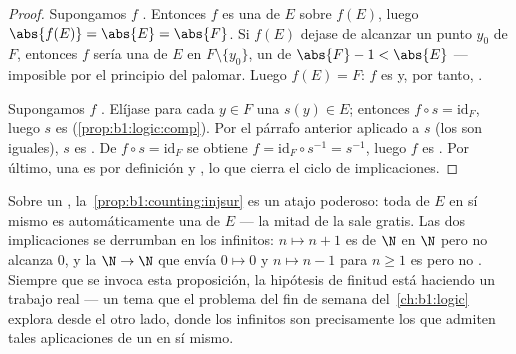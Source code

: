 \begin{proof}
Supongamos $f$ . Entonces $f$ es una  de $E$ sobre
$f(E)$, luego $\abs{f(E)} = \abs{E} = \abs{F}$. Si $f(E)$ dejase de
alcanzar un punto $y_0$ de $F$, entonces $f$ sería una  de $E$
en $F \setminus \{y_0\}$, un  de  $\abs{F} - 1 < \abs{E}$
--- imposible por el principio del palomar. Luego $f(E) = F$: $f$ es
 y, por tanto, .

Supongamos $f$ . Elíjase para cada $y \in F$ una
 $s(y) \in E$; entonces $f \circ s = \mathrm{id}_F$,
luego $s$ es  (\cref{prop:b1:logic:comp}). Por el párrafo
anterior aplicado a $s$ (los  son iguales), $s$ es
. De $f \circ s = \mathrm{id}_F$ se obtiene
$f = \mathrm{id}_F \circ s^{-1} = s^{-1}$, luego $f$ es . Por
último, una   es por definición  y
, lo que cierra el ciclo de implicaciones.
\end{proof}

\begin{example}\label{ex:b1:counting:finiteonly}
Sobre un  \emph{}, la~\cref{prop:b1:counting:injsur} es un
atajo poderoso: toda   de $E$ en sí mismo es
automáticamente una  de $E$ --- la mitad de la 
sale gratis. Las dos implicaciones se derrumban en los 
infinitos: $n \mapsto n + 1$ es  de $\N$ en $\N$ pero no
alcanza $0$, y la  $\N \to \N$ que envía $0 \mapsto 0$ y
$n \mapsto n - 1$ para $n \geq 1$ es  pero no .
Siempre que se invoca esta proposición, la hipótesis de finitud está
haciendo un trabajo real --- un tema que el problema del fin de semana
del~\cref{ch:b1:logic} explora desde el otro lado, donde los 
infinitos son precisamente los que admiten tales aplicaciones de un
 en sí mismo.
\end{example}

